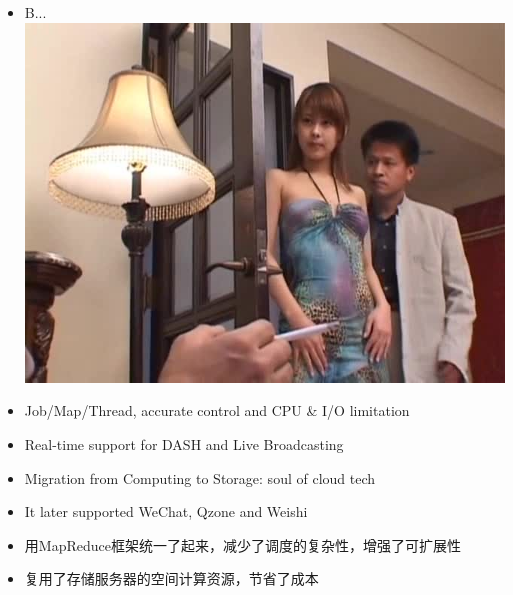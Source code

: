 \documentclass{beamer}
\begin{document}
\begin{frame}
\begin{itemize}
\item B...\\
\includegraphics[scale=0.40]{fig/bfj3.jpg}
\end{itemize}
\end{frame}

\begin{frame}
\begin{itemize}
\item Job/Map/Thread, accurate control and CPU \& I/O limitation
\item Real-time support for DASH and Live Broadcasting
\item Migration from Computing to Storage: soul of cloud tech
\item It later supported WeChat, Qzone and Weishi
\item 用MapReduce框架统一了起来，减少了调度的复杂性，增强了可扩展性
\item 复用了存储服务器的空间计算资源，节省了成本
\end{itemize}
\end{frame}
\end{document}
